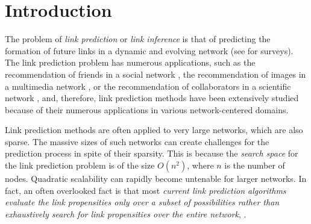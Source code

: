 \section{Introduction}
\label{sec-intro}
The problem of {\em link prediction} or {\em link inference} is that of predicting the formation of future links in a dynamic and
evolving network (see \cite{chancc,linyuan-2011,Hasan-2011} for surveys). The link prediction problem has numerous
applications, such as the recommendation of friends in a social
network \cite{barbieri2014,back,tang2015}, the recommendation of images in a multimedia network \cite{adom}, or
the recommendation of collaborators in a scientific network \cite{kunegis,kleinberg}, and, therefore, link
prediction methods have been extensively studied  because of their numerous applications in various network-centered domains.

Link prediction methods are often applied to very large networks, which are also sparse.  The massive sizes of such networks can
create challenges for the prediction process in spite of their sparsity. This is because the {\em search space} for the link
prediction problem is of the size $O(n^2)$, where $n$ is the number of nodes. Quadratic scalability can rapidly become untenable for
larger networks. In fact, an often overlooked fact is that most {\em current link prediction algorithms evaluate the link
propensities only over a subset of possibilities rather than exhaustively search for link propensities over the entire network}, \eg \cite{dwang,lee,zhao2016,zhu2016}.



